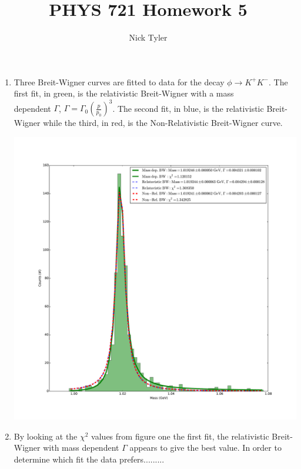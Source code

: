 \documentclass[pdftex]{article}
\title{PHYS 721 Homework 5}
\author{Nick Tyler}
\date{}
\begin{document}
\captionsetup[figure]{aboveskip=-15pt}
\captionsetup[figure]{belowskip=15pt}
\maketitle
\begin{enumerate}
	\item Three Breit-Wigner curves are fitted to data for the decay $\phi \rightarrow K^{+} K^{-}$. 
		The first fit, in green, is the relativistic Breit-Wigner with a mass \\ dependent $\Gamma$, 
		$\Gamma = \Gamma_{0} \left( \frac{p}{p_0} \right)^3$. The second fit, in blue, is the relativistic Breit-Wigner 
		while the third, in red, is the Non-Relativistic Breit-Wigner curve. \

		\includegraphics[scale=0.35]{Problem_1_and_2.pdf}\\
		
	\pagebreak

	\item By looking at the $\chi^2$ values from figure one the first fit, the relativistic Breit-Wigner
		with mass dependent $\Gamma$ appears to give the best value. In order to determine which fit the data
		prefers.........



\end{enumerate}
\end{document}
